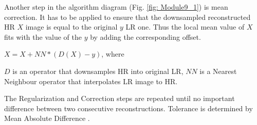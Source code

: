 Another step in the algorithm diagram (Fig. \ref{fig: Module9_1}) is mean correction. It has to be applied to ensure that the downsampled reconstructed HR $X$ image is equal to the original $y$ LR one. Thus the local mean value of $X$ fits with the value of the $y$ by adding the corresponding offset.

\centerline{$X=X+NN*(D(X)-y)$, where}


$D$ is an operator that downsamples HR into original LR,
\newline $NN$ is a Nearest Neighbour operator that interpolates LR image to HR.

The Regularization and Correction steps are repeated until no important difference between two consecutive reconstructions. Tolerance is determined by Mean Absolute Difference .




